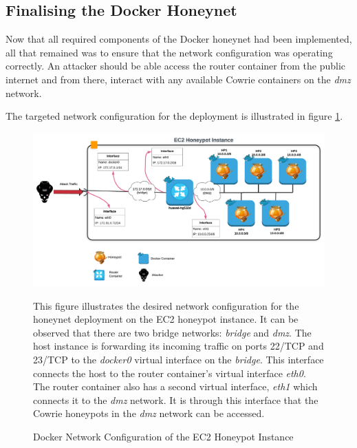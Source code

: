 \subsection{Finalising the Docker Honeynet}
Now that all required components of the Docker honeynet had been implemented, all that remained was to ensure that the network configuration was operating correctly. An attacker should be able access the router container from the public internet and from there, interact with any available Cowrie containers on the \textit{dmz} network. 

The targeted network configuration for the deployment is illustrated in figure \ref{fig:honeypot-instance-networking}.

\begin{figure}[ht]
      \centering
      \includegraphics[width=160mm, scale=1]{Images/Honeypot_Instance_Networking.png}
      \caption{Docker Network Configuration of the EC2 Honeypot Instance} 
      \medskip
      \small
		This figure illustrates the desired network configuration for the honeynet deployment on the EC2 honeypot instance. It can be observed that there are two bridge networks: \textit{bridge} and \textit{dmz}. The host instance is forwarding its incoming traffic on ports 22/TCP and 23/TCP to the \textit{docker0} virtual interface on the \textit{bridge}. This interface connects the host to the router container's virtual interface \textit{eth0}. The router container also has a second virtual interface, \textit{eth1} which connects it to the \textit{dmz} network. It is through this interface that the Cowrie honeypots in the \textit{dmz} network can be accessed.
\label{fig:honeypot-instance-networking}
\end{figure}



